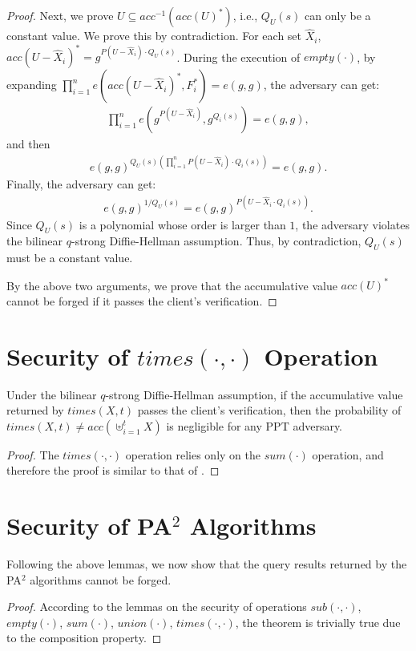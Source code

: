 \begin{proof}
  Next, we prove $U \subseteq acc^{-1}(acc(U)^*)$, i.e., $Q_U(s)$ can only be a constant value. We prove this by contradiction. For each set $\widehat{X}_i$, $acc(U - \widehat{X}_i)^* = g^{P(U-\widehat{X}_i) \cdot Q_U(s)}$. During the execution of $empty(\cdot)$, by expanding $\prod_{i=1}^n e(acc(U-\widehat{X}_i)^*, F_i^*)=e(g, g)$, the adversary can get:
  \begin{align*}
    \prod_{i=1}^n e(g^{P(U-\widehat{X}_i)}, g^{Q_i(s)}) = e(g, g),
  \end{align*}
  and then
  \begin{align*}
    e(g,g)^{Q_U(s)(\prod_{i=1}^nP(U-\widehat{X}_i)\cdot Q_i(s))}=e(g,g).
  \end{align*}
  Finally, the adversary can get:
  \begin{align*}
    e(g, g)^{1/Q_U(s)} = e(g, g)^{P(U-\widehat{X}_i \cdot Q_i(s))}.
  \end{align*}
  Since $Q_U(s)$ is a polynomial whose order is larger than $1$, the adversary violates the bilinear $q$-strong Diffie-Hellman assumption. Thus, by contradiction, $Q_U(s)$ must be a constant value.

  By the above two arguments, we prove that the accumulative value ${acc(U)}^*$ cannot be forged if it passes the client's verification.
\end{proof}

\section{Security of $times(\cdot, \cdot)$ Operation}

\begin{lemma}\label{lem:aggregate-queries:times}
  Under the bilinear $q$-strong Diffie-Hellman assumption, if the accumulative value returned by $times(X,t)$ passes the client's verification, then the probability of $times(X,t) \neq acc(\uplus_{i=1}^t X)$ is negligible for any PPT adversary.
\end{lemma}
\begin{proof}
  The $times(\cdot, \cdot)$ operation relies only on the $sum(\cdot)$ operation, and therefore the proof is similar to that of .
\end{proof}

\section{Security of PA$^2$ Algorithms}

Following the above lemmas, we now show that the query results returned by the PA$^2$ algorithms cannot be forged.
\aggregatesecuritytheorem*

\begin{proof}
  According to the lemmas on the security of operations $sub(\cdot,\cdot)$, $empty(\cdot)$, $sum(\cdot)$, $union(\cdot)$, $times(\cdot,\cdot)$, the theorem is trivially true due to the composition property.
\end{proof}

